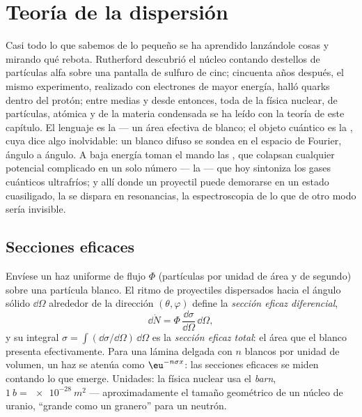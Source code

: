 \chapter{Teoría de la dispersión}\label{ch:b3:scattering-theory}

Casi todo lo que sabemos de lo pequeño se ha aprendido lanzándole cosas y
mirando qué rebota. Rutherford descubrió el núcleo contando destellos de
partículas alfa sobre una pantalla de sulfuro de cinc; cincuenta años
después, el mismo experimento, realizado con electrones de mayor energía,
halló quarks dentro del protón; entre medias y desde entonces, toda  de la física nuclear, de partículas, atómica y de la materia
condensada se ha leído con la teoría de este capítulo. El lenguaje es la
\emph{} --- un área efectiva de blanco; el objeto cuántico es
la \emph{}, cuya  dice algo
inolvidable: un blanco difuso se sondea en el espacio de Fourier, ángulo a
ángulo. A baja energía toman el mando las , que colapsan
cualquier potencial complicado en un solo número --- la  --- que hoy sintoniza los gases cuánticos ultrafríos; y allí
donde un proyectil puede demorarse en un estado cuasiligado, la  se dispara en resonancias, la espectroscopia de lo que de otro modo
sería invisible.

\section{Secciones eficaces}

\begin{definition}\label{def:b3:scattering-theory:cross-section}
Envíese un haz uniforme de flujo $\Phi$ (partículas por unidad de área y de
segundo) sobre una partícula blanco. El ritmo de proyectiles dispersados
hacia el ángulo sólido $\dd\Omega$ alrededor de la dirección $(\theta,
\varphi)$ define la \emph{sección eficaz diferencial},
\[
\dd\dot N = \Phi\,\frac{\dd\sigma}{\dd\Omega}\,\dd\Omega ,
\]
y su integral $\sigma = \int(\dd\sigma/\dd\Omega)\,\dd\Omega$ es
la \emph{sección eficaz total}: el área que el blanco presenta
efectivamente. Para una lámina delgada con $n$ blancos por unidad de
volumen, un haz se atenúa como $\eu^{-n\sigma x}$: las secciones eficaces se
miden contando lo que emerge. Unidades: la física nuclear usa el
\emph{barn}, $\qty{1}{b} = \qty{e-28}{m^2}$ --- aproximadamente el tamaño
geométrico de un núcleo de uranio, ``grande como un granero'' para un
neutrón.
\end{definition}

